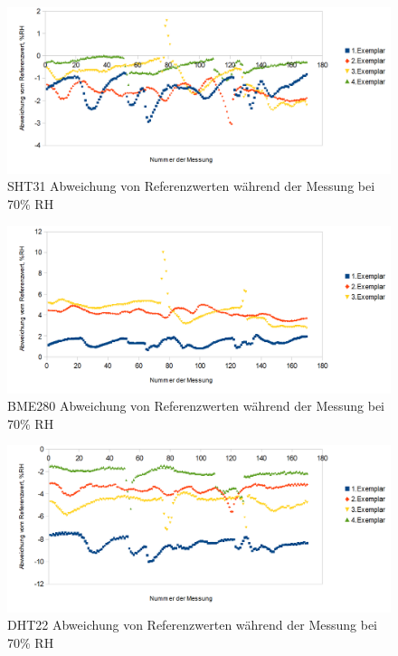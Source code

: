 \documentclass[runningheads]{llncs}
\begin{document}
\begin{figure}[h]
\includegraphics[width=\textwidth]{pictures/SHT31_70.png}
\caption{SHT31 Abweichung von Referenzwerten während der Messung bei 70\% RH}
\end{figure}


\begin{figure}[h]
\includegraphics[width=\textwidth]{pictures/BME280_70.png}
\caption{BME280 Abweichung von Referenzwerten während der Messung bei 70\% RH}
\end{figure}

\begin{figure}[h]
\includegraphics[width=\textwidth]{pictures/DHT22_70.png}
\caption{DHT22 Abweichung von Referenzwerten während der Messung bei 70\% RH}
\end{figure}
\end{document}
